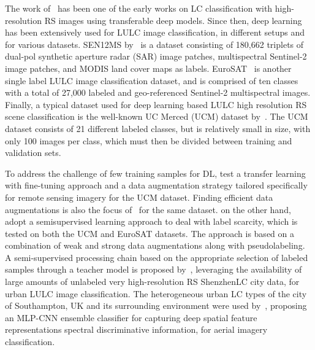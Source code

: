 \documentclass[journal]{IEEEtran}
\begin{document}
The work of~\cite{maggiori2016convolutional} has been one of the early works on LC classification with high-resolution RS images using transferable deep models. Since then, deep learning has been extensively used for LULC image classification, in different setups and for various datasets. SEN12MS by~\cite{Schmitt2019} is a dataset consisting of 180,662 triplets of dual-pol synthetic aperture radar (SAR) image patches, multispectral Sentinel-2 image patches, and MODIS land cover maps as labels. EuroSAT~\citep{helber2019eurosat} is another single label LULC image classification dataset, and is comprised of ten classes with a total of 27,000 labeled and geo-referenced  Sentinel-2 multispectral images. Finally, a typical  dataset used for deep learning based LULC high resolution RS scene classification is the well-known UC Merced (UCM) dataset by~\cite{yang2010bag}. The UCM dataset consists of 21 different labeled classes, but is relatively small in size, with only 100 images per class, which must then be divided between training and validation sets. 

To address the challenge of few training samples for DL, \cite{scott2017training} test a transfer learning with fine-tuning approach and a data augmentation strategy tailored specifically for remote sensing imagery for the UCM dataset. Finding efficient data augmentations is also the focus of~\cite{stivaktakis2019deep} for the same dataset. \cite{gomez2021msmatch} on the other hand, adopt a semisupervised learning approach to deal with label scarcity, which is tested on both the UCM and EuroSAT datasets. The approach is based on a combination of weak and strong data augmentations along with pseudolabeling. A semi-supervised processing chain based on the appropriate selection of labeled samples through a teacher model is proposed by~\cite{fan2020semi}, leveraging the availability of large amounts of unlabeled very high-resolution RS ShenzhenLC city data, for urban LULC image classification. The heterogeneous urban LC types of the city of Southampton, UK and its surrounding environment were used by~\cite{zhang2018hybrid}, proposing an MLP-CNN ensemble classifier for capturing deep spatial feature representations spectral discriminative information, for aerial imagery classification.
\end{document}
